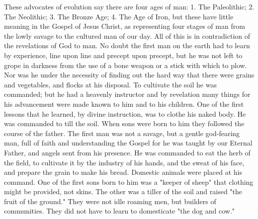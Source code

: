 These advocates of evolution say there are four ages of man: 1. The Paleolithic; 2. The
Neolithic; 3. The Bronze Age; 4. The Age of Iron, but these have little meaning in the Gospel
of Jesus Christ, as representing four stages of man from the lowly savage to the cultured man
of our day. All of this is in contradiction of the revelations of God to man. No doubt the first
man on the earth had to learn by experience, line upon line and precept upon precept, but he
was not left to grope in darkness from the use of a bone weapon or a stick with which to
plow. Nor was he under the necessity of finding out the hard way that there were grains and
vegetables, and flocks at his disposal. To cultivate the soil he was commanded; but he had a
heavenly instructor and by revelation many things for his advancement were made known to
him and to his children. One of the first lessons that he learned, by divine instruction, was to
clothe his naked body. He was commanded to till the soil. When sons were born to him they
followed the course of the father. The first man was not a savage, but a gentle god-fearing
man, full of faith and understanding the Gospel for he was taught by our Eternal Father, and
angels sent from his presence. He was commanded to eat the herb of the field, to cultivate it
by the industry of his hands, and the sweat of his face, and prepare the grain to make his
bread. Domestic animals were placed at his command. One of the first sons born to him was
a "keeper of sheep" that clothing might be provided, not skins. The other was a tiller of the
soil and raised "the fruit of the ground." They were not idle roaming men, but builders of
communities. They did not have to learn to domesticate "the dog and cow."

